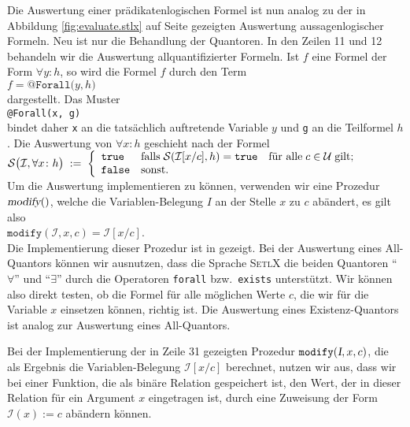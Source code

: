Die Auswertung einer pr\"{a}dikatenlogischen Formel ist nun analog zu der in Abbildung \ref{fig:evaluate.stlx}
auf Seite \pageref{fig:evaluate.stlx} gezeigten Auswertung aussagenlogischer Formeln.  
Neu ist nur die Behandlung der Quantoren.  In den Zeilen 11 und 12 behandeln wir die Auswertung
allquantifizierter Formeln.  Ist $f$ eine Formel der Form $\forall y: h$,
so wird die Formel $f$ durch den Term 
\\[0.2cm]
\hspace*{1.3cm}
$f = \texttt{@Forall(}y, h\mathtt{)}$
\\[0.2cm]
dargestellt.  Das Muster 
\\[0.2cm]
\hspace*{1.3cm}
\texttt{@Forall(x, g)}
\\[0.2cm]
bindet daher \texttt{x} an die tats\"{a}chlich auftretende Variable $y$ und \texttt{g} an die Teilformel $h$.
Die Auswertung von $\forall x\colon h$ geschieht nach der Formel
\\[0.2cm]
\hspace*{1.3cm}
$\mathcal{S}\bigl(\mathcal{I}, \forall x\colon h\bigr) \;:=\; \left\{
      \begin{array}{ll}
         \mathtt{true}  & \mbox{falls}\; \mathcal{S}(\mathcal{I}[x/c], h) = \mathtt{true}\quad \mbox{f\"{u}r alle}\; c\in \mathcal{U}\;\mbox{gilt}; \\
         \mathtt{false} & \mbox{sonst}.
      \end{array}
      \right.
$
\\[0.2cm]
Um die Auswertung implementieren zu k\"{o}nnen, verwenden wir eine Prozedur $\textsl{modify}()$, welche die
Variablen-Belegung $I$ an der Stelle $x$ zu $c$ ab\"{a}ndert, es gilt also
\\[0.2cm]
\hspace*{1.3cm}
$\mathtt{modify}(\mathcal{I},x,c) = \mathcal{I}[x/c]$. 
\\[0.2cm]
Die Implementierung dieser Prozedur ist in  gezeigt.
 Bei der Auswertung eines All-Quantors k\"{o}nnen wir ausnutzen, dass die Sprache \textsc{SetlX}
die beiden Quantoren ``$\forall$'' und ``$\exists$'' durch die Operatoren \texttt{forall} bzw.~\texttt{exists}
unterst\"{u}tzt.  Wir k\"{o}nnen also direkt testen, ob die 
Formel f\"{u}r alle m\"{o}glichen Werte $c$, die wir f\"{u}r die Variable $x$ einsetzen k\"{o}nnen,
richtig ist.  Die Auswertung eines Existenz-Quantors ist analog zur Auswertung eines All-Quantors.

Bei der Implementierung der in Zeile 31 gezeigten Prozedur $\texttt{modify}(\textsl{I},x,c)$, 
die als Ergebnis die Variablen-Belegung $\mathcal{I}[x/c]$ berechnet, nutzen wir aus, dass
wir bei einer Funktion, die als bin\"{a}re Relation gespeichert ist, den Wert, der in dieser
Relation f\"{u}r ein Argument $x$ eingetragen ist, durch eine Zuweisung der Form
$\mathcal{I}(x) \mathtt{:=} c$ ab\"{a}ndern k\"{o}nnen.

